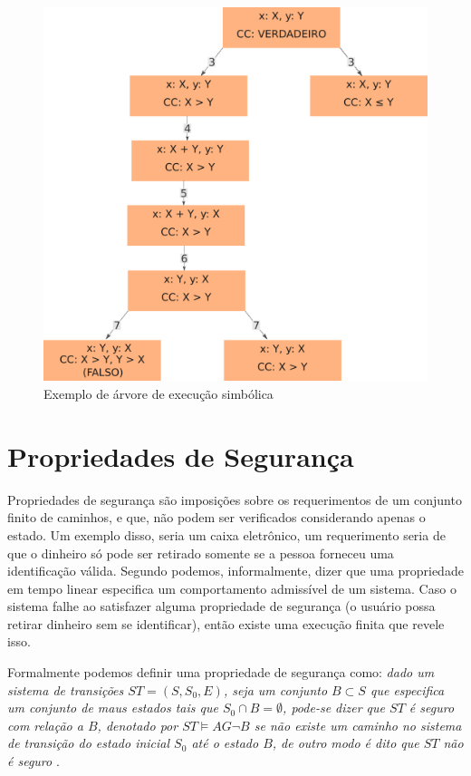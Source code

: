\begin{figure}[htb]
	\caption{\label{fig:executionTree} Exemplo de árvore de execução simbólica}
	\begin{center}
	    \includegraphics[scale=0.25]{resources/executionTree.png}
	\end{center}
\end{figure}

\section{Propriedades de Segurança}
\label{sec:prop_seg}
Propriedades de segurança são imposições sobre os requerimentos de um conjunto finito de caminhos, e que, não podem ser verificados considerando apenas o estado. Um exemplo disso, seria um caixa eletrônico, um requerimento seria de que o dinheiro só pode ser retirado somente se a pessoa forneceu uma identificação válida\cite{Baier:2008}. Segundo \cite{Rocha:2015tese} podemos, informalmente, dizer que uma propriedade em tempo linear especifica um comportamento admissível de um sistema. Caso o sistema falhe ao satisfazer alguma propriedade de segurança (o usuário possa retirar dinheiro sem se identificar), então existe uma execução finita que revele isso.
\par
Formalmente podemos definir uma propriedade de segurança como: \textit{dado um sistema de transições $ST = (S, S_0, E)$, seja um conjunto $B \subset S$ que especifica um conjunto de maus estados tais que $S_0 \cap B = \emptyset$, pode-se dizer que $ST$ é seguro com relação a $B$, denotado por $ST \models AG\neg B$ se não existe um caminho no sistema de transição do estado inicial $S_0$ até o estado $B$, de outro modo é dito que $ST$ não é seguro} \cite{Rocha:2015tese}.

